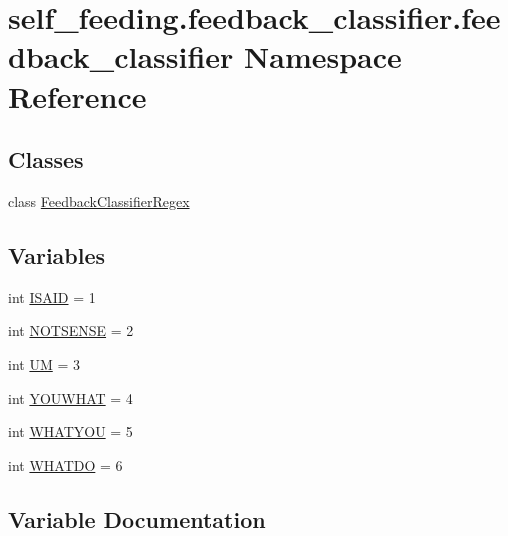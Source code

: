 \hypertarget{namespaceself__feeding_1_1feedback__classifier_1_1feedback__classifier}{}\section{self\+\_\+feeding.\+feedback\+\_\+classifier.\+feedback\+\_\+classifier Namespace Reference}
\label{namespaceself__feeding_1_1feedback__classifier_1_1feedback__classifier}
\subsection*{Classes}
\begin{DoxyCompactItemize}
\item 
class \hyperlink{classself__feeding_1_1feedback__classifier_1_1feedback__classifier_1_1FeedbackClassifierRegex}{Feedback\+Classifier\+Regex}
\end{DoxyCompactItemize}
\subsection*{Variables}
\begin{DoxyCompactItemize}
\item 
int \hyperlink{namespaceself__feeding_1_1feedback__classifier_1_1feedback__classifier_a7cc843761cb60045c26bbb42a57653a7}{I\+S\+A\+ID} = 1
\item 
int \hyperlink{namespaceself__feeding_1_1feedback__classifier_1_1feedback__classifier_a030d84af1998c7179e21eab9669b5687}{N\+O\+T\+S\+E\+N\+SE} = 2
\item 
int \hyperlink{namespaceself__feeding_1_1feedback__classifier_1_1feedback__classifier_a03eda18986cf18079af87b6d92435804}{UM} = 3
\item 
int \hyperlink{namespaceself__feeding_1_1feedback__classifier_1_1feedback__classifier_a6105b657b7a4b91ea32a02463da53d7a}{Y\+O\+U\+W\+H\+AT} = 4
\item 
int \hyperlink{namespaceself__feeding_1_1feedback__classifier_1_1feedback__classifier_a7251fdd282d8e3a67702897427b37ad7}{W\+H\+A\+T\+Y\+OU} = 5
\item 
int \hyperlink{namespaceself__feeding_1_1feedback__classifier_1_1feedback__classifier_a2d8ca9fa8318db1013634952957f20c5}{W\+H\+A\+T\+DO} = 6
\end{DoxyCompactItemize}


\subsection{Variable Documentation}
\mbox{\label{namespaceself__feeding_1_1feedback__classifier_1_1feedback__classifier_a7cc843761cb60045c26bbb42a57653a7}} 
